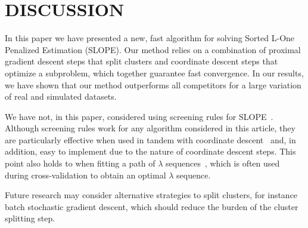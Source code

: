 \section{DISCUSSION}\label{sec:discussion}

In this paper we have presented a new, fast algorithm for solving Sorted L-One Penalized Estimation (SLOPE).
Our method relies on a combination of proximal gradient descent steps that split clusters and coordinate descent steps that optimize a subproblem, which together guarantee fast convergence.
In our results, we have shown that our method outperforms all competitors for a large variation of real and simulated datasets.

We have not, in this paper, considered using screening rules for SLOPE~\parencite{larsson2020c,elvira2022}.
Although screening rules work for any algorithm considered in this article, they are particularly effective when used in tandem with coordinate descent~\parencite{fercoq2015} and, in addition, easy to implement due to the nature of coordinate descent steps.
This point also holds to when fitting a path of \(\lambda\) sequences~\parencite{friedman2007,friedman2010}, which is often used during cross-validation to obtain an optimal \(\lambda\) sequence. 

Future research may consider alternative strategies to split clusters, for instance batch stochastic gradient descent, which should reduce the burden of the cluster splitting step.
